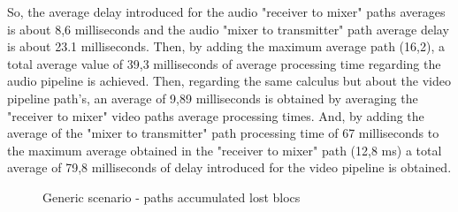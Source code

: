 So, the average delay introduced for the audio "receiver to mixer" paths averages is about 8,6 milliseconds and the audio "mixer to transmitter" path average delay is about 23.1 milliseconds. Then, by adding the maximum average path (16,2), a total average value of 39,3 milliseconds of average processing time regarding the audio pipeline is achieved. Then, regarding the same calculus but about the video pipeline path's, an average of 9,89 milliseconds is obtained by averaging the "receiver to mixer" video paths average processing times. And, by adding the average of the "mixer to transmitter" path processing time of 67 milliseconds to the maximum average obtained in the "receiver to mixer" path (12,8 ms) a total average of 79,8 milliseconds of delay introduced for the video pipeline is obtained.

\begin{figure}[!htb]
  \begin{center}
    \begin{subfigmatrix}{2}
    \end{subfigmatrix}
    \caption{Generic scenario - paths accumulated lost blocs}
    \label{F:gsalb}
  \end{center}
\end{figure}

